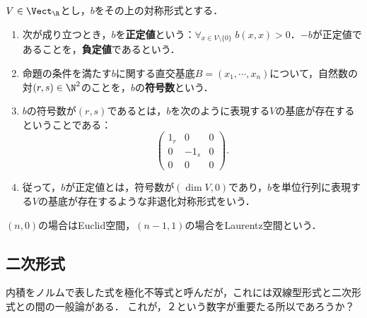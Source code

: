 \documentclass[uplatex, dvipdfmx]{jsreport}
\begin{document}
\begin{definition}
    $V\in\Vect_\R$とし，$b$をその上の対称形式とする．
    \begin{enumerate}
        \item 次が成り立つとき，$b$を\textbf{正定値}という：$\forall_{ x\in V\setminus\{0\}}\;b(x,x)>0$．$-b$が正定値であることを，\textbf{負定値}であるという．
        \item 命題の条件を満たす$b$に関する直交基底$B=(x_1,\cdots,x_n)$について，自然数の対$(r,s)\in\N^2$のことを，$b$の\textbf{符号数}という．
        \item $b$の符号数が$(r,s)$であるとは，$b$を次のように表現する$V$の基底が存在するということである：\[\begin{pmatrix}1_r&0&0\\0&-1_s&0\\0&0&0\end{pmatrix}.\]
        \item 従って，$b$が正定値とは，符号数が$(\dim V,0)$であり，$b$を単位行列に表現する$V$の基底が存在するような非退化対称形式をいう．
    \end{enumerate}
\end{definition}
\begin{remarks}
    $(n,0)$の場合はEuclid空間，$(n-1,1)$の場合をLaurentz空間という．
\end{remarks}

\subsection{二次形式}

\begin{tcolorbox}[colframe=ForestGreen, colback=ForestGreen!10!white,breakable,colbacktitle=ForestGreen!40!white,coltitle=black,fonttitle=\bfseries\sffamily,
title=]
    内積をノルムで表した式を極化不等式と呼んだが，これには双線型形式と二次形式との間の一般論がある．
    これが，２という数字が重要たる所以であろうか？
\end{tcolorbox}
\end{document}
